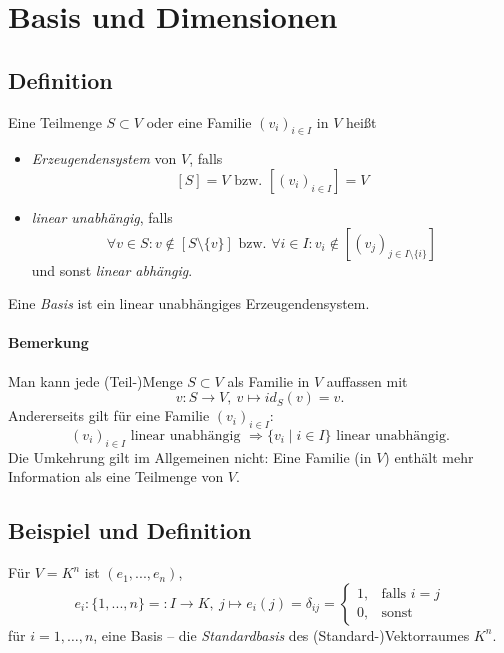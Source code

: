 \section{Basis und Dimensionen}

 \subsection{Definition}
 	\begin{Definition}[Basis]
 		Eine Teilmenge $S\subset V$ oder eine Familie $(v_i)_{i\in I}$ in $ V $ heißt
 		\begin{itemize}
 			\item \emph{Erzeugendensystem} von $ V $, falls \[
 			      [S] = V \text{ bzw. } [(v_i)_{i\in I}] = V
 		\]
 		\item \emph{linear unabhängig}, falls \[
 		\forall v\in S: v \notin [S\setminus\{{v\}}] \text{ bzw. } \forall i\in I: v_i \notin [(v_j)_{j\in I\setminus\{{i\}}}]
 	\] und sonst \emph{linear abhängig}.
 	\end{itemize}
 	Eine \emph{Basis} ist ein linear unabhängiges Erzeugendensystem.
 	\end{Definition}

 	\paragraph{Bemerkung}
 		Man kann jede (Teil-)Menge $S\subset V$ als Familie in $V$ auffassen mit
 		\[
 			v: S \to V,\ v\mapsto id_S(v) = v.
 		\]
 		Andererseits gilt für eine Familie $(v_i)_{i\in I} $:
 		\[
 			(v_i)_{i\in I} \text{ linear unabhängig } \Rightarrow \{v_i \mid i\in I\} \text{ linear unabhängig.}
 		\]
 		Die Umkehrung gilt im Allgemeinen nicht: Eine Familie (in $ V $) enthält mehr Information als eine Teilmenge von $ V $.

 \subsection{Beispiel und Definition}
 	\begin{Definition}[Standardbasis]
 		Für $V = K^n$ ist $(e_1, ... , e_n)$,
 		\begin{equation*}
 			e_i:\{{1, ... ,n\}} =: I\to K,\ j\mapsto e_i(j)= \delta_{ij}=
 			\begin{cases}
 				1, & \text{falls } i=j \\
 				0, & \text{sonst}
 			\end{cases}
 		\end{equation*}
 		für $i=1,\dots,n$, eine Basis -- die \emph{Standardbasis} des (Standard-)Vektorraumes $K^n$.
 	\end{Definition}

